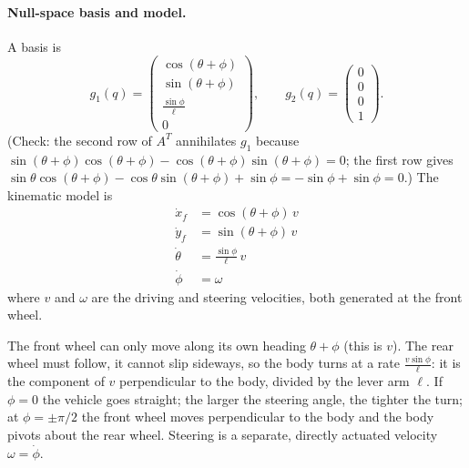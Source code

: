 \documentclass[11pt,a4paper]{article}
\def\boldsymbol#1{#1}%
\newcommand{\q}{\boldsymbol{q}}
\newcommand{\g}{\boldsymbol{g}}
\theoremstyle{definition}
\theoremstyle{plain}
\theoremstyle{remark}
\begin{document}
\paragraph{Null-space basis and model.} A basis is
\[
  \g_1(\q)=\begin{pmatrix}\cos(\theta+\phi)\\ \sin(\theta+\phi)\\ \frac{\sin\phi}{\ell}\\0\end{pmatrix},\qquad
  \g_2(\q)=\begin{pmatrix}0\\0\\0\\1\end{pmatrix}.
\]
(Check: the second row of $A^T$ annihilates $\g_1$ because $\sin(\theta+\phi)\cos(\theta+\phi)-\cos(\theta+\phi)\sin(\theta+\phi)=0$; the first row gives $\sin\theta\cos(\theta+\phi)-\cos\theta\sin(\theta+\phi)+\sin\phi=-\sin\phi+\sin\phi=0$.) The kinematic model is
\begin{equation}
\boxed{\;
\begin{aligned}
  \dot x_f&=\cos(\theta+\phi)\,v\\
  \dot y_f&=\sin(\theta+\phi)\,v\\
  \dot\theta&=\frac{\sin\phi}{\ell}\,v\\
  \dot\phi&=\omega
\end{aligned}\;}
\label{eq:bike-km}
\end{equation}
where $v$ and $\omega$ are the driving and steering velocities, both generated at the front wheel.

\begin{intuition}
The front wheel can only move along its own heading $\theta+\phi$ (this is $v$). The rear wheel must follow, it cannot slip sideways, so the body turns at a rate $\frac{v\sin\phi}{\ell}$: it is the component of $v$ perpendicular to the body, divided by the lever arm $\ell$. If $\phi=0$ the vehicle goes straight; the larger the steering angle, the tighter the turn; at $\phi=\pm\pi/2$ the front wheel moves perpendicular to the body and the body pivots about the rear wheel. Steering is a separate, directly actuated velocity $\omega=\dot\phi$.
\end{intuition}
\end{document}
